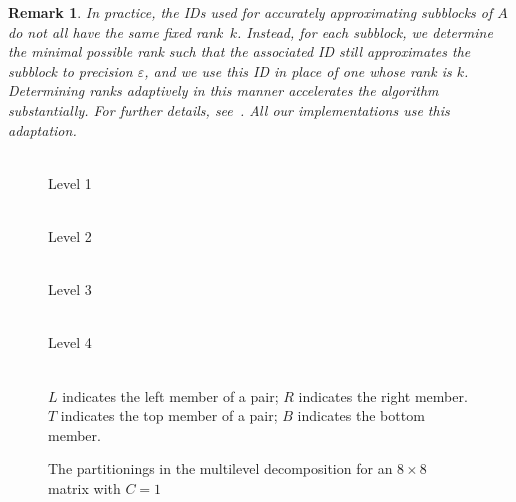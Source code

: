 \documentclass[final,3p,times]{elsarticle}
\def\epsilon{\varepsilon}
\newtheorem{remark1}[theorem]{Remark}
\newenvironment{remark}{\begin{remark1}\rm}{\end{remark1}}
\begin{document}
\begin{remark}
\label{adaptivity}
In practice, the IDs used for accurately approximating subblocks of $A$
do not all have the same fixed rank~$k$. Instead, for each subblock,
we determine the minimal possible rank such that the associated ID still
approximates the subblock to precision $\epsilon$, and we use this ID
in place of one whose rank is $k$.
Determining ranks adaptively in this manner accelerates the algorithm
substantially. For further details, see~\cite{oneil-woolfe-rokhlin}.
All our implementations use this adaptation.
\end{remark}


\begin{figure}
\begin{center}
\caption{The partitionings in the multilevel decomposition
         for an $8 \times 8$ matrix with $C = 1$}
\label{multi}
\vspace{1.5em}
\begin{minipage}{1in}
\begin{center}
 \\
Level 1
\end{center}
\end{minipage}
\begin{minipage}{1in}
\begin{center}
 \\
Level 2
\end{center}
\end{minipage}
\begin{minipage}{1in}
\begin{center}
 \\
Level 3
\end{center}
\end{minipage}
\begin{minipage}{1in}
\begin{center}
 \\
Level 4
\end{center}
\end{minipage}
\\\vspace{1 em}
$L$ indicates the left member of a pair; $R$ indicates the right member. \\
$T$ indicates the top member of a pair; $B$ indicates the bottom member.
\end{center}
\end{figure}
\end{document}
